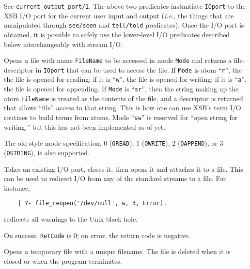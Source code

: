 \begin{description}

 
   See {\tt current\_output\_port/1}.
 
   The above two predicates instantiate {\tt IOport} to the XSB I/O port
   for the current user input and output ({\it i.e.}, the things 
   that are manipulated through {\tt see/seen} and {\tt tell/told} predicates).
   Once the I/O port is obtained, it is possible to safely use the
   lower-level I/O predicates described below interchangeably with stream
   I/O. 
    
 
    Opens a file with name {\tt FileName} to be accessed
    in mode {\tt Mode} and returns a file-descriptor in {\tt IOport} that
    can be used to access the file.  If {\tt Mode} is atom ``{\tt r}'', the
    the file is opened for reading; if it is ``{\tt w}'', the file is
    opened for writing; if it is ``{\tt a}'', the file is opened for
    appending.  If {\tt Mode} is ``{\tt sr}'', then the string making
    up the atom {\tt FileName} is treated as the contents of the file, and
    a descriptor is returned that allows ``file'' access to that string.
    This is how one can use XSB's term I/O routines to build terms from
    atoms. Mode ``{\tt sw}'' is reserved for ``open string for writing,''
    but this has not been implemented as of yet.

    The old-style mode specification, 0 ({\tt OREAD}), 1 ({\tt OWRITE}), 2
    ({\tt OAPPEND}), or 3 ({\tt OSTRING}), is also supported.

    Takes an existing I/O port, closes it, then opens it and
    attaches it to a file. This can be used to redirect I/O from any of the
    standard streams to a file. For instance, 
\begin{verbatim}
    | ?- file_reopen('/dev/null', w, 3, Error).
\end{verbatim}
    redirects all warnings to the Unix black hole. 

    On success, {\tt RetCode} is 0; on error, the return code is negative.

    Opens a temporary file with a unique filename. The file is deleted when
    it is closed or when the program terminates.


\end{description}
